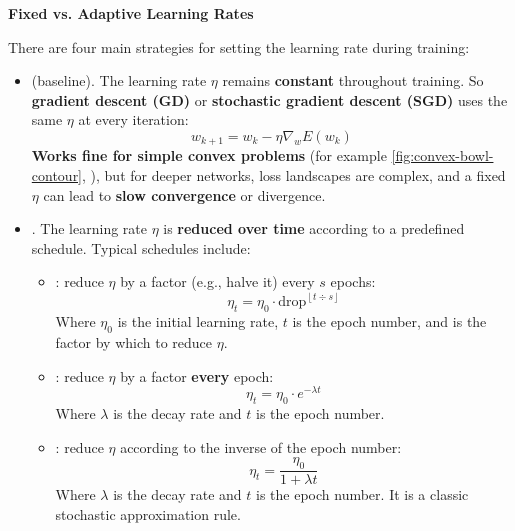 \highspace
\begin{flushleft}
    \textcolor{Green3}{ \textbf{Fixed vs. Adaptive Learning Rates}}
\end{flushleft}
There are four main strategies for setting the learning rate during training:
\begin{itemize}
    \item {} (baseline). The learning rate $\eta$ remains \textbf{constant} throughout training. So \textbf{gradient descent (GD)} or \textbf{stochastic gradient descent (SGD)} uses the same $\eta$ at every iteration:
    \begin{equation*}
        w_{k+1} = w_k - \eta \nabla_w E\left(w_k\right)
    \end{equation*}
    \textbf{Works fine for simple convex problems} (for example \autoref{fig:convex-bowl-contour}, ), but for deeper networks, loss landscapes are complex, and a fixed $\eta$ can lead to \textbf{slow convergence} or divergence.


    \item {}. The learning rate $\eta$ is \textbf{reduced over time} according to a predefined schedule. Typical schedules include:
    \begin{itemize}
        \item {}: reduce $\eta$ by a factor (e.g., halve it) every $s$ epochs:
        \begin{equation}
            \eta_t = \eta_0 \cdot \text{drop}^{\left\lfloor t \div s \right\rfloor}
        \end{equation}
        Where $\eta_0$ is the initial learning rate, $t$ is the epoch number, and  is the factor by which to reduce $\eta$.

        \item {}: reduce $\eta$ by a factor \textbf{every} epoch:
        \begin{equation}
            \eta_t = \eta_0 \cdot e^{-\lambda t}
        \end{equation}
        Where $\lambda$ is the decay rate and $t$ is the epoch number.

        \item {}: reduce $\eta$ according to the inverse of the epoch number:
        \begin{equation}
            \eta_t = \frac{\eta_0}{1 + \lambda t}
        \end{equation}
        Where $\lambda$ is the decay rate and $t$ is the epoch number. It is a classic stochastic approximation rule.


\end{itemize}
\end{itemize}
